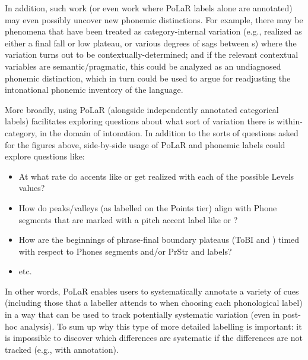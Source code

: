 In addition, such work (or even work where PoLaR labels alone are annotated) may even possibly uncover new phonemic distinctions. For example, there may be phenomena that have been treated as category-internal variation (e.g.,  realized as either a final fall or low plateau, or various degrees of sags between s) where the variation turns out to be contextually-determined; and if the relevant contextual variables are semantic\slash pragmatic, this could be analyzed as an undiagnosed phonemic distinction, which in turn could be used to argue for readjusting the intonational phonemic inventory of the language.

More broadly, using PoLaR (alongside independently annotated categorical labels) facilitates exploring questions about what sort of variation there is within-category, in the domain of intonation. In addition to the sorts of questions asked for the figures above, side-by-side usage of PoLaR and phonemic labels could explore questions like:

\begin{itemize}
	\item At what rate do accents like  or  get realized with each of the possible Levels values?
	\item How do peaks\slash valleys (as labelled on the Points tier) align with Phone segments that are marked with a pitch accent label like  or ?
	\item How are the beginnings of phrase-final boundary plateaus (ToBI  and ) timed with respect to Phones segments and/or PrStr \textlabel{*} and \textlabel{]} labels?
	\item etc.
\end{itemize}

In other words, PoLaR enables users to systematically annotate a variety of cues (including those that a labeller attends to when choosing each phonological label) in a way that can be used to track potentially systematic variation (even in post-hoc analysis). To sum up why this type of more detailed labelling is important: it is impossible to discover which differences are systematic if the differences are not tracked (e.g., with annotation).


